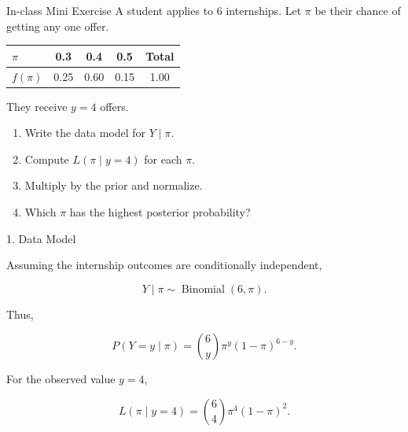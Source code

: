 \documentclass[12pt]{beamer}
\begin{document}
{
\begin{frame}{In-class Mini Exercise}
A student applies to 6 internships. Let $\pi$ be their chance of getting any one offer.

\begin{center}
\begin{tabular}{lcccc}
\toprule
$\pi$ & 0.3 & 0.4 & 0.5 & Total \\
\midrule
$f(\pi)$ & 0.25 & 0.60 & 0.15 & 1.00 \\
\bottomrule
\end{tabular}
\end{center}

They receive $y=4$ offers.

\begin{enumerate}
\item Write the data model for $Y\mid\pi$.
\item Compute $L(\pi\mid y=4)$ for each $\pi$.
\item Multiply by the prior and normalize.
\item Which $\pi$ has the highest posterior probability?
\end{enumerate}
\end{frame}

\begin{frame}{}
\begin{block}{1. Data Model}
%
%
%

Assuming the internship outcomes are conditionally independent,

\[
Y\mid \pi \sim \operatorname{Binomial}(6,\pi).
\]

Thus,

\[
P(Y=y\mid\pi)
=
{6\choose y}\pi^y(1-\pi)^{6-y}.
\]

For the observed value $y=4$,

\[
L(\pi\mid y=4)
=
{6\choose4}\pi^4(1-\pi)^2.
\]
\end{block}
\end{frame}

}
\end{document}
